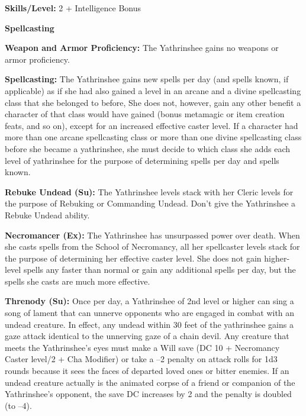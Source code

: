 \textbf{Skills/Level:} 2 + Intelligence Bonus

\poorbab{}
\poorfor{}
\poorref{}
\goodwil{}

\begin{extraclasstable}{\textbf{Spellcasting}}
\end{extraclasstable}

\classfeatures

\textbf{Weapon and Armor Proficiency:} The Yathrinshee gains no weapons or armor proficiency.

\textbf{Spellcasting:} The Yathrinshee gains new spells per day (and spells known, if applicable) as if she had also gained a level in an arcane and a divine spellcasting class that she belonged to before, She does not, however, gain any other benefit a character of that class would have gained (bonus metamagic or item creation feats, and so on), except for an increased effective caster level. If a character had more than one arcane spellcasting class or more than one divine spellcasting class before she became a yathrinshee, she must decide to which class she adds each level of yathrinshee for the purpose of determining spells per day and spells known.

\textbf{Rebuke Undead (Su):} The Yathrinshee levels stack with her Cleric levels for the purpose of Rebuking or Commanding Undead. Don't give the Yathrinshee a Rebuke Undead ability.

\textbf{Necromancer (Ex):} The Yathrinshee has unsurpassed power over death. When she casts spells from the School of Necromancy, all her spellcaster levels stack for the purpose of determining her effective caster level. She does not gain higher-level spells any faster than normal or gain any additional spells per day, but the spells she casts are much more effective.

\textbf{Threnody (Su):} Once per day, a Yathrinshee of 2nd level or higher can sing a song of lament that can unnerve opponents who are engaged in combat with an undead creature. In effect, any undead within 30 feet of the yathrinshee gains a gaze attack identical to the unnerving gaze of a chain devil. Any creature that meets the Yathrinshee’s eyes must make a Will save (DC 10 + Necromancy Caster level/2 + Cha Modifier) or take a –2 penalty on attack rolls for 1d3 rounds because it sees the faces of departed loved ones or bitter enemies. If an undead creature actually is the animated corpse of a friend or companion of the Yathrinshee’s opponent, the save DC increases by 2 and the penalty is doubled (to –4).

